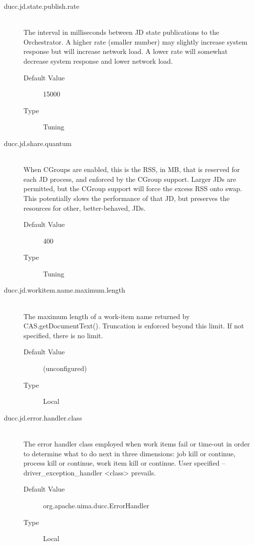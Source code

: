 \begin{description}
        \item[ducc.jd.state.publish.rate] \hfill \\
          The interval in milliseconds between JD state publications to the Orchestrator.
          A higher rate (smaller number)
          may slightly increase system response but will increase network load. A lower rate will 
          somewhat decrease system response and lower network load. 
          \begin{description}
            \item[Default Value] 15000 
            \item[Type] Tuning 
          \end{description}

        \item[ducc.jd.share.quantum] \hfill \\
          When CGroups are enabled, this is the RSS, in MB, that is reserved for each JD process, and enforced
          by the CGroup support.  Larger JDs are permitted, but the CGroup support will force the excess
          RSS onto swap.  This potentially slows the performance of that JD, but preserves the resources
          for other, better-behaved, JDs.
          \begin{description}
            \item[Default Value] 400
            \item[Type] Tuning 
          \end{description}


        \item[ducc.jd.workitem.name.maximum.length] \hfill \\
          The maximum length of a work-item name returned by CAS.getDocumentText().
          Truncation is enforced beyond this limit.
          If not specified, there is no limit.
          \begin{description}
            \item[Default Value] (unconfigured) 
            \item[Type] Local
          \end{description}
          
        
        \item[ducc.jd.error.handler.class] \hfill \\
          The error handler class employed when work items fail or time-out in order
          to determine what to do next in three dimensions: 
          job kill or continue, process kill or continue, work item kill or continue.
          User specified --driver_exception_handler <class> prevails.
          \begin{description}
            \item[Default Value] org.apache.uima.ducc.ErrorHandler
            \item[Type] Local
          \end{description}
                  

\end{description}
